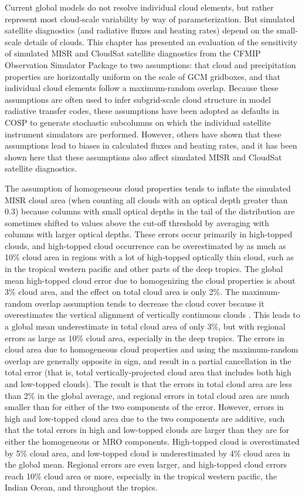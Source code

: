 Current global models do not resolve individual cloud elements, but
rather represent most cloud-scale variability by way of
parameterization. But simulated satellite diagnostics (and radiative
fluxes and heating rates) depend on the small-scale details of clouds.
This chapter has presented an evaluation of the sensitivity of simulated
MISR and CloudSat satellite diagnostics from the CFMIP Observation
Simulator Package to two assumptions: that cloud and precipitation
properties are horizontally uniform on the scale of GCM gridboxes, and
that individual cloud elements follow a maximum-random overlap. Because
these assumptions are often used to infer subgrid-scale cloud structure
in model radiative transfer codes, these assumptions have been adopted
as defaults in COSP to generate stochastic subcolumns on which the
individual satellite instrument simulators are performed. However,
others have shown that these assumptions lead to biases in calculated
fluxes and heating rates, and it has been shown here that these
assumptions also affect simulated MISR and CloudSat satellite
diagnostics.

The assumption of homogeneous cloud properties tends to inflate the
simulated MISR cloud area (when counting all clouds with an optical
depth greater than 0.3) because columns with small optical depths in the
tail of the distribution are sometimes shifted to values above the
cut-off threshold by averaging with columns with larger optical depths.
These errors occur primarily in high-topped clouds, and high-topped
cloud occurrence can be overestimated by as much as 10\% cloud area in
regions with a lot of high-topped optically thin cloud, such as in the
tropical western pacific and other parts of the deep tropics. The global
mean high-topped cloud error due to homogenizing the cloud properties is
about 3\% cloud area, and the effect on total cloud area is only 2\%.
The maximum-random overlap assumption tends to decrease the cloud cover
because it overestimates the vertical alignment of vertically continuous
clouds
\citep{mace_and_benson-troth_2002, hogan_and_illingworth_2000, barker_2008}.
This leads to a global mean underestimate in total cloud area of only
3\%, but with regional errors as large as 10\% cloud area, especially in
the deep tropics. The errors in cloud area due to homogeneous cloud
properties and using the maximum-random overlap are generally opposite
in sign, and result in a partial cancellation in the total error (that
is, total vertically-projected cloud area that includes both high and
low-topped clouds). The result is that the errors in total cloud area
are less than 2\% in the global average, and regional errors in total
cloud area are much smaller than for either of the two components of the
error. However, errors in high and low-topped cloud area due to the two
components are additive, such that the total errors in high and
low-topped clouds are larger than they are for either the homogeneous or
MRO components. High-topped cloud is overestimated by 5\% cloud area,
and low-topped cloud is underestimated by 4\% cloud area in the global
mean. Regional errors are even larger, and high-topped cloud errors
reach 10\% cloud area or more, especially in the tropical western
pacific, the Indian Ocean, and throughout the tropics.

